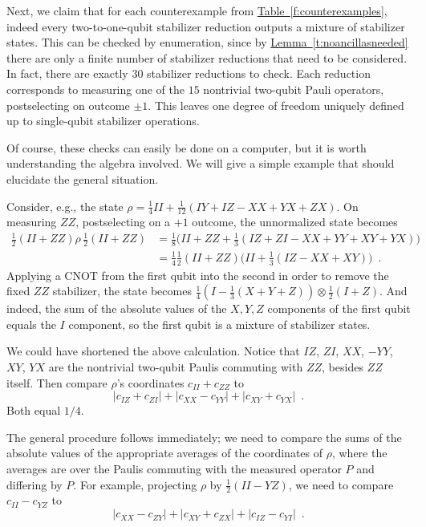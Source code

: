 \documentclass[11pt]{article}
\def\abs #1{\lvert #1\rvert}
\newcommand{\beq}{\begin{equation}}
\newcommand{\eeq}{\end{equation}}
\theoremstyle{note}
\newcommand{\lemref}[1]{\hyperref[#1]{{Lemma~\ref*{#1}}}}
\newcommand{\tabref}[1]{\hyperref[#1]{{Table~\ref*{#1}}}}
\begin{document}
Next, we claim that for each counterexample from \tabref{f:counterexamples}, indeed every two-to-one-qubit stabilizer reduction outputs a mixture of stabilizer states.  This can be checked by enumeration, since by \lemref{t:noancillasneeded} there are only a finite number of stabilizer reductions that need to be considered.  In fact, there are exactly $30$ stabilizer reductions to check.  Each reduction corresponds to measuring one of the $15$ nontrivial two-qubit Pauli operators, postselecting on outcome $\pm1$.  This leaves one degree of freedom uniquely defined up to single-qubit stabilizer operations.  

Of course, these checks can easily be done on a computer, but it is worth understanding the algebra involved.  We will give a simple example that should elucidate the general situation.  

Consider, e.g., the state $\rho = \tfrac{1}{4}II + \tfrac{1}{12}(IY + IZ - XX + YX + ZX)$.  On measuring $ZZ$, postselecting on a $+1$ outcome, the unnormalized state becomes 
\begin{equation}\begin{split}
\tfrac{1}{2} (II + ZZ) \rho \, \tfrac{1}{2} (II + ZZ) 
&= \tfrac{1}{8}\big(II + ZZ + \tfrac{1}{3}(IZ + ZI - XX + YY + XY + YX)\big) \\
&= \tfrac{1}{4}\tfrac{1}{2}(II + ZZ)\big(II + \tfrac{1}{3}(IZ - XX + XY)\big)
 \enspace .
\end{split}\end{equation}
Applying a CNOT from the first qubit into the second in order to remove the fixed $ZZ$ stabilizer, the state becomes $\tfrac{1}{4}(I-\tfrac{1}{3}(X + Y + Z)) \otimes \tfrac{1}{2}(I + Z)$.  And indeed, the sum of the absolute values of the $X,Y,Z$ components of the first qubit equals the $I$ component, so the first qubit is a mixture of stabilizer states.  

We could have shortened the above calculation.  Notice that $IZ$, $ZI$, $XX$, $-YY$, $XY$, $YX$ are the nontrivial two-qubit Paulis commuting with $ZZ$, besides $ZZ$ itself.  Then compare $\rho$'s coordinates $c_{II} + c_{ZZ}$ to 
\beq \label{e:coordaverage}
\abs{c_{IZ}+c_{ZI}} + \abs{c_{XX}-c_{YY}} + \abs{c_{XY}+c_{YX}}
 \enspace .
\eeq
Both equal $1/4$.  

The general procedure follows immediately; we need to compare the sums of the absolute values of the appropriate averages of the coordinates of $\rho$, where the averages are over the Paulis commuting with the measured operator $P$ and differing by $P$.  For example, projecting $\rho$ by $\tfrac{1}{2}(II - YZ)$, we need to compare $c_{II} - c_{YZ}$ to 
\beq
\abs{c_{XX} - c_{ZY}} + \abs{c_{XY} + c_{ZX}} + \abs{c_{IZ} - c_{YI}}
 \enspace .
\eeq
\end{document}
